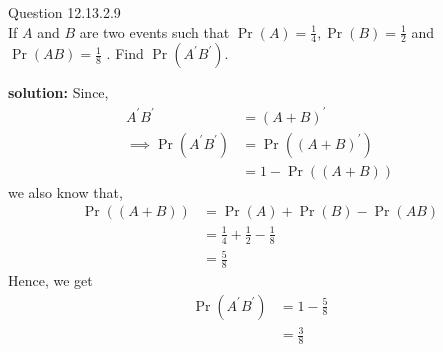 \documentclass{article}
\begin{document}
\providecommand{\pr}[1]{\ensuremath{\Pr\left(#1\right)}}
\providecommand{\brak}[1]{\ensuremath{\left(#1\right)}}
\newcommand{\solution}{\noindent \textbf{solution: }}

Question 12.13.2.9\\
If $A$ and $B$ are two events such that $\pr{A} = \frac{1}{4}, \pr{B} = \frac{1}{2}$ and $\pr{AB} = \frac{1}{8}$ . Find $\pr{A^{\prime}B^{\prime}}.$

\solution
Since,
\begin{align}
	A^{\prime}B^{\prime} &= \brak{A+B}^{\prime} \\
	\implies \pr{A^{\prime}B^{\prime}} &= \pr{\brak{A+B}^{\prime}} \\
	&= 1-\pr{\brak{A+B}}
\end{align}
we also know that,
\begin{align}
	\pr{\brak{A+B}} &= \pr{A} + \pr{B} - \pr{AB} \\
	&= \frac{1}{4} +\frac{1}{2} - \frac{1}{8} \\
	&= \frac{5}{8}
\end{align}
Hence, we get
\begin{align}
	\pr{A^{\prime}B^{\prime}} &= 1 - \frac{5}{8} \\
	&= \frac{3}{8}
\end{align}
\end{document}
